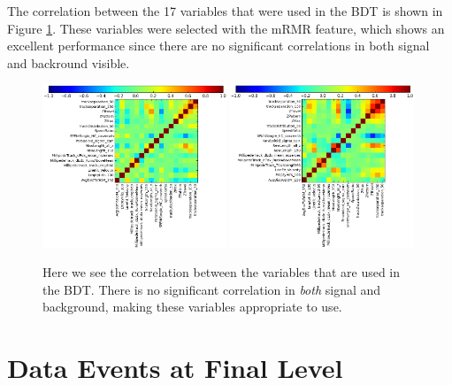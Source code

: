 \begin{appendices}
\noindent The correlation between the 17 variables that were used in the BDT is shown in Figure \ref{fig:correlation}. These variables were selected with the mRMR feature, which shows an excellent performance since there are no significant correlations in both signal and backround visible.
\begin{figure}[ht]
\centering
\includegraphics[width=0.49\textwidth]{appendix/img/correlationbackground.png}
\includegraphics[width=0.49\textwidth]{appendix/img/correlationsignal.png}
\caption{Here we see the correlation between the variables that are used in the BDT. There is no significant correlation in \textit{both} signal and background, making these variables appropriate to use.}
\label{fig:correlation}
\end{figure}

\usechapterimagefalse
{}
\chapter{Data Events at Final Level}
\label{ch:eventviewerFinal}
\usechapterimagetrue


\end{appendices}
